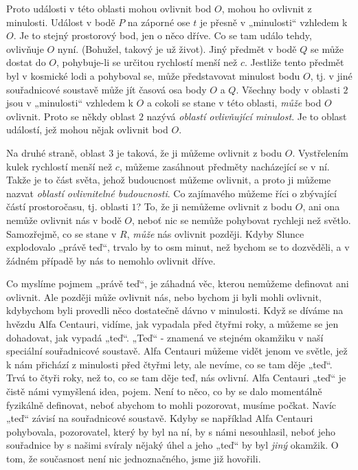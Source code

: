 {    Proto události v této oblasti mohou ovlivnit bod \(O\), mohou ho ovlivnit z minulosti. Událost 
    v bodě \(P\) na záporné ose \(t\) je přesně v „minulosti“ vzhledem k \(O\). Je to stejný 
    prostorový bod, jen o něco dříve. Co se tam událo tehdy, ovlivňuje \(O\) nyní. (Bohužel, takový 
    je už život). Jiný předmět v bodě \(Q\) se může dostat do \(O\), pohybuje-li se určitou 
    rychlostí menší než \(c\). Jestliže tento předmět byl v kosmické lodi a pohyboval se, může 
    představovat minulost bodu \(O\), tj. v jiné souřadnicové soustavě může jít časová osa body 
    \(O\) a \(Q\). Všechny body v oblasti \(2\) jsou v „minulosti“ vzhledem k \(O\) a cokoli se 
    stane v této oblasti, \emph{může} bod \(O\) ovlivnit. Proto se někdy oblast \(2\) nazývá 
    \emph{oblastí ovlivňující minulost}. Je to oblast událostí, jež mohou nějak ovlivnit bod \(O\).
    
    Na druhé straně, oblast \(3\) je taková, že ji můžeme ovlivnit z bodu \(O\). Vystřelením kulek 
    rychlostí menší než \(c\), můžeme zasáhnout předměty nacházející se v ní. Takže je to část 
    světa, jehož budoucnost můžeme ovlivnit, a proto ji můžeme nazvat \emph{oblastí ovlivnitelné 
    budoucnosti}. Co zajímavého můžeme říci o zbývající částí prostoročasu, tj. oblasti \(1\)? To, 
    že ji nemůžeme ovlivnit z bodu \(O\), ani ona nemůže ovlivnit nás v bodě \(O\), neboť nic se 
    nemůže pohybovat rychleji než světlo. Samozřejmě, co se stane v \(R\), \emph{může} nás ovlivnit 
    později. Kdyby Slunce explodovalo „právě teď“, trvalo by to osm minut, než bychom se to 
    dozvěděli, a v žádném případě by nás to nemohlo ovlivnit dříve.
    
    Co myslíme pojmem „právě teď“, je záhadná věc, kterou nemůžeme definovat ani ovlivnit. Ale 
    později může ovlivnit nás, nebo bychom ji byli mohli ovlivnit, kdybychom byli provedli něco 
    dostatečně dávno v minulosti. Když se díváme na hvězdu Alfa Centauri, vidíme, jak vypadala před 
    čtyřmi roky, a můžeme se jen dohadovat, jak vypadá „teď“. „Teď“ - znamená ve stejném okamžiku 
    v naší speciální souřadnicové soustavě. Alfa Centauri můžeme vidět jenom ve světle, jež k nám 
    přichází z minulosti před čtyřmi lety, ale nevíme, co se tam děje „teď“. Trvá to čtyři roky, 
    než to, co se tam děje teď, nás ovlivní. Alfa Centauri „teď“ je čistě námi vymyšlená idea, 
    pojem. Není to něco, co by se dalo momentálně fyzikálně definovat, neboť abychom to mohli 
    pozorovat, musíme počkat. Navíc „teď“ závisí na souřadnicové soustavě. Kdyby se například Alfa 
    Centauri pohybovala, pozorovatel, který by byl na ní, by s námi nesouhlasil, neboť jeho 
    souřadnice by s našimi svíraly nějaký úhel a jeho „teď“ by byl \emph{jiný} okamžik. O tom, že 
    současnost není nic jednoznačného, jsme již hovořili.
    
}
